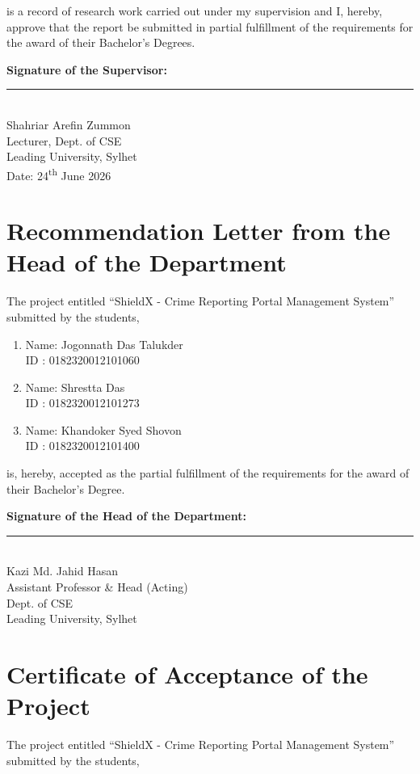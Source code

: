 \documentclass[12pt, a4paper, twoside, openany]{report}
\begin{document}
is a record of research work carried out under my supervision and I, hereby, approve that the report be submitted in partial fulfillment of the requirements for the award of their Bachelor's Degrees.
\vspace{2cm}

\noindent\textbf{Signature of the Supervisor:}\\[1.5cm]
\noindent\rule{6cm}{0.4pt}\\
Shahriar Arefin Zummon\\
Lecturer, Dept. of CSE\\
Leading University, Sylhet\\
Date: 24\textsuperscript{th} June 2026

\chapter*{Recommendation Letter from the Head of the Department}
The project entitled ``ShieldX - Crime Reporting Portal Management System'' submitted by the students,

\begin{enumerate}[label=\arabic*.]
    \item Name: Jogonnath Das Talukder\\
          ID : 0182320012101060
    \item Name: Shrestta Das\\
          ID : 0182320012101273
    \item Name: Khandoker Syed Shovon\\
          ID : 0182320012101400
\end{enumerate}

is, hereby, accepted as the partial fulfillment of the requirements for the award of their Bachelor's Degree.
\vspace{2cm}

\noindent\textbf{Signature of the Head of the Department:}\\[1.5cm]
\noindent\rule{6cm}{0.4pt}\\
Kazi Md. Jahid Hasan\\
Assistant Professor \& Head (Acting)\\
Dept. of CSE\\
Leading University, Sylhet

\chapter*{Certificate of Acceptance of the Project}
The project entitled ``ShieldX - Crime Reporting Portal Management System'' submitted by the students,
\end{document}
